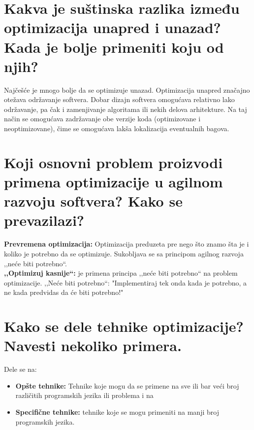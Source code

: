 \documentclass[a4paper]{article}
\begin{document}
\section{Kakva je suštinska razlika između optimizacija unapred i unazad? 
         Kada je bolje primeniti koju od njih?}
  Najčešće je mnogo bolje da se optimizuje unazad.
  Optimizacija unapred značajno otežava održavanje softvera.
  Dobar dizajn softvera omogućava relativno lako održavanje, pa čak i zamenjivanje algoritama ili 
  nekih delova arhitekture. Na taj način se omogućava zadržavanje obe verzije koda (optimizovane i 
  neoptimizovane), čime se omogućava lakša lokalizacija eventualnih bagova.

\section{Koji osnovni problem proizvodi primena optimizacije u agilnom razvoju softvera? 
         Kako se prevazilazi?}
  
  \textbf{Prevremena optimizacija:} Optimizacija preduzeta pre nego što znamo šta je i koliko je
  potrebno da se optimizuje. Sukobljava se sa principom agilnog razvoja ,,neće biti potrebno``.\\
  \indent \textbf{,,Optimizuj kasnije``:} je primena principa ,,neće biti potrebno`` na problem 
  optimizacije. ,,Neće biti potrebno``: "Implementiraj tek onda kada je potrebno, 
  a ne kada predvidas da će biti potrebno!"
   
\section{Kako se dele tehnike optimizacije? Navesti nekoliko primera.}
  Dele se na: 
  \begin{itemize}
    \item \textbf{Opšte tehnike:} Tehnike koje mogu da se primene na sve ili bar veći broj 
          različitih programskih jezika ili problema i na 
    \item \textbf{Specifične tehnike:} tehnike koje se mogu primeniti na manji broj programskih jezika.
  \end{itemize}
\end{document}
